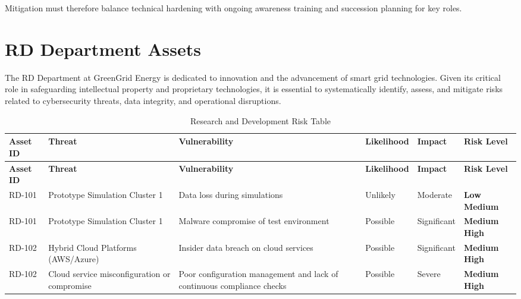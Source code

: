 Mitigation must therefore balance technical hardening with ongoing awareness training and succession planning for key roles.

\section{\ac{RD} Department Assets}

The \ac{RD} Department at GreenGrid Energy is dedicated to innovation and the advancement of smart grid technologies. Given its critical role in safeguarding intellectual property and proprietary technologies, it is essential to systematically identify, assess, and mitigate risks related to cybersecurity threats, data integrity, and operational disruptions.

\begin{longtable}{|p{2.5cm}|p{3.5cm}|p{3.5cm}|p{2cm}|p{2cm}|p{2cm}|}
  \caption{Research and Development Risk Table}
  \label{tab:rd_assets_risks}                                                                                                                                             \\
  \hline
  \textbf{Asset ID} & \textbf{Threat}                              & \textbf{Vulnerability}                 & \textbf{Likelihood} & \textbf{Impact} & \textbf{Risk Level} \\
  \hline
  \endfirsthead

  \hline
  \textbf{Asset ID} & \textbf{Threat}                              & \textbf{Vulnerability}                 & \textbf{Likelihood} & \textbf{Impact} & \textbf{Risk Level} \\
  \hline
  \endhead

  \hline
  \endfoot

  RD-101            & Prototype Simulation Cluster 1               & Data loss during simulations                                           & Unlikely            & Moderate        & \textbf{Low Medium}    \\
  \hline
  RD-101            & Prototype Simulation Cluster 1               & Malware compromise of test environment                                 & Possible            & Significant     & \textbf{Medium High}     \\
  \hline
  RD-102            & Hybrid Cloud Platforms (AWS/Azure)           & Insider data breach on cloud services                                  & Possible            & Significant     & \textbf{Medium High}     \\
  \hline
  RD-102            & Cloud service misconfiguration or compromise & Poor configuration management and lack of continuous compliance checks  & Possible           & Severe          & \textbf{Medium High}       \\
  \hline
\end{longtable}

